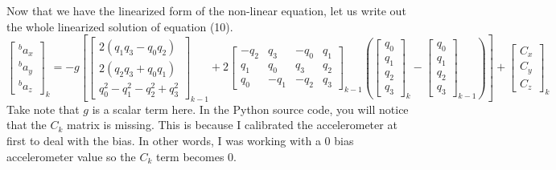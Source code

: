 \documentclass[a4paper,12pt]{book}
\begin{document}
Now that we have the linearized form of the non-linear equation, let us write out the whole linearized solution of equation (10).
\begin{equation}
    \begin{bmatrix} ^ba_x \\ ^ba_y \\ ^ba_z \end{bmatrix}_k = -g\left[ \begin{bmatrix} 2(q_1q_3 - q_0q_2) \\ 2(q_2q_3 + q_0q_1) \\ q_0^2 - q_1^2 - q_2^2 + q_3^2 \end{bmatrix}_{k-1} + 2\begin{bmatrix} -q_2 & q_3 & -q_0 & q_1 \\ q_1 & q_0 & q_3 & q_2 \\ q_0 & -q_1 & -q_2 & q_3 \end{bmatrix}_{k-1} \left( \begin{bmatrix} q_0 \\ q_1 \\ q_2 \\ q_3 \end{bmatrix}_k - \begin{bmatrix} q_0 \\ q_1 \\ q_2 \\ q_3 \end{bmatrix}_{k-1} \right) \right] + \begin{bmatrix} C_x \\ C_y \\ C_z \end{bmatrix}_k
\end{equation}
Take note that $g$ is a scalar term here. In the Python source code, you will notice that the $C_k$ matrix is missing. This is because I calibrated the accelerometer at first to deal with the bias. In other words, I was working with a $0$ bias accelerometer value so the $C_k$ term becomes $0$.
\end{document}

